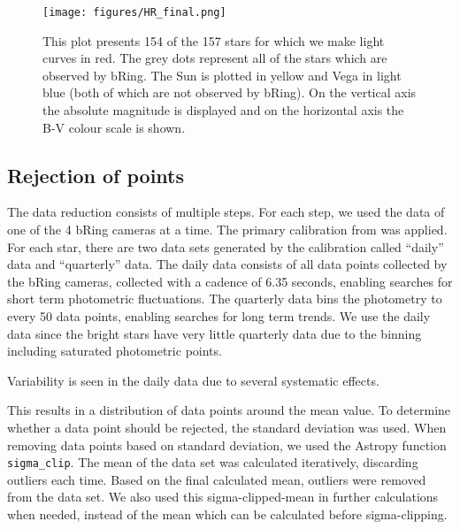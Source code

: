 \documentclass{aa}
\begin{document}
\begin{figure}
    \centering
    \texttt{[image: figures/HR\_final.png]}
    \caption{This plot presents 154 of the 157 stars for which we make light curves in red.
      The grey dots represent all of the stars which are observed by bRing.
      The Sun is plotted in yellow and Vega in light blue (both of which are not observed by bRing).
      On the vertical axis the absolute magnitude is displayed and on the horizontal axis the B-V colour scale is shown.}
    \label{HRD}
  \end{figure}

\subsection{Rejection of points}

%
The data reduction consists of multiple steps.
%
For each step, we used the data of one of the 4 bRing cameras at a time.
%
The primary calibration from \cite{Talens_2018} was applied.
%
For each star, there are two data sets generated by the calibration called ``daily'' data and ``quarterly'' data.
%
The daily data consists of all data points collected by the bRing cameras, collected with a cadence of 6.35 seconds, enabling searches for short term photometric fluctuations.
%
The quarterly data bins the photometry to every 50 data points, enabling searches for long term trends.
%
We use the daily data since the bright stars have very little quarterly data due to the binning including saturated photometric points.

Variability is seen in the daily data due to several systematic effects.

%
This results in a distribution of data points around the mean value. To determine whether a data point should be rejected, the standard deviation was used.
%
When removing data points based on standard deviation, we used the Astropy function \texttt{sigma\_clip}.
%
The mean of the data set was calculated iteratively, discarding outliers each time.
%
Based on the final calculated mean, outliers were removed from the data set.
%
We also used this sigma-clipped-mean in further calculations when needed, instead of the mean which can be calculated before sigma-clipping.
\end{document}
